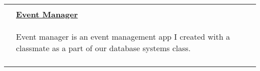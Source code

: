 \documentclass[letterpaper,11pt,oneside]{article}
\begin{document}
\begin{tabularx}{\textwidth}{l X}
    & \\
    \vspace{-1.5ex} & \textbf{\href{https://github.com/prati0100/EventManager}{Event Manager}} \\
    \vspace{-3ex} & \begin{adjustwidth}{}{}Event manager is an event management app I created with a classmate as a part of our database systems class.\end{adjustwidth} \\
    & \\

\end{tabularx}
\end{document}
